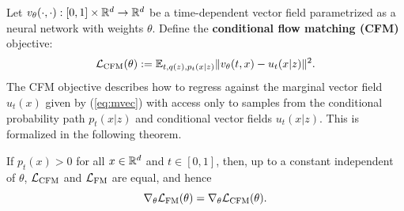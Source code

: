 \documentclass[10pt]{article}
\theoremstyle{plain}
\theoremstyle{definition}
\theoremstyle{remark}
\newcommand{\LFM}[0]{\gL_{\rm FM}}
\newcommand{\LCFM}[0]{\gL_{\rm CFM}}
\begin{document}
Let $v_\theta(\cdot, \cdot):[0,1]\times\mathbb{R}^d\to\mathbb{R}^d$ be a time-dependent vector field parametrized as a neural network with weights $\theta$. Define the \textbf{conditional flow matching (CFM)} objective:
\begin{equation}\label{eq:CFM}
\LCFM(\theta) := \E_{t, q(z), p_t(x | z)} \|v_\theta(t, x) - u_t(x | z)\|^2.
\end{equation}
The CFM objective describes how to regress against the marginal vector field $u_t(x)$ given by (\ref{eq:mvec}) with access only to samples from the conditional probability path $p_t(x|z)$ and conditional vector fields $u_t(x|z)$. This is formalized in the following theorem.
\begin{theoremE}\label{thm:cmf}
If $p_t(x) > 0$ for all $x \in \mathbb{R}^d$ and $t \in [0, 1]$, then, up to a constant independent of $\theta$, $\LCFM$ and $\LFM$ are equal, and hence
\begin{equation}
\nabla_\theta \LFM(\theta) = \nabla_\theta \LCFM(\theta).
\end{equation}
\end{theoremE}
\end{document}

